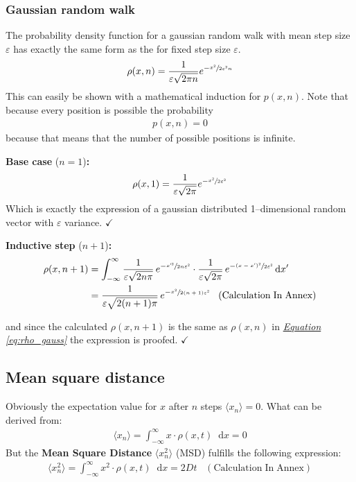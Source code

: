 \documentclass[a4paper, parskip=half]{scrartcl}
\newcommand{\effect}[1]{%
	\textbf{#1}%
}
\newcommand{\diff}{\mathop{}\!\mathrm{d}}
\newcommand{\myEqRef}[1]{\textit{\hyperref[eq:#1]{Equation \ref*{eq:#1}}}}
\newcommand{\myEqLabel}[1]{\label{eq:#1}}
\newcommand{\myEqAnnex}[1]{\;\;\;\mathrm{(Calculation\;In\;Annex)} \myEqLabel{#1}}
\begin{document}
\subsubsection{Gaussian random walk}
The probability density function for a gaussian random walk with mean step size $\varepsilon$ has exactly the same form as the for fixed step size $\varepsilon$.
\begin{align}
\rho(x,n) = \frac{1}{\varepsilon\sqrt{2\pi n}} e^{-\sfrac{x^2}{2\varepsilon^2 n}} \myEqLabel{rho_gauss}
\end{align}
This can easily be shown with a mathematical induction for $p(x,n)$. Note that because every position is possible the probability 
\begin{align}
p(x,n) = 0 
\end{align}
because that means that the number of possible positions is infinite.

\textbf{Base case} ($n = 1$)\textbf{:}
\begin{align}
\rho(x,1) = \frac{1}{\varepsilon\sqrt{2\pi}} e^{-\sfrac{x^2}{2\varepsilon^2}}
\end{align}
Which is exactly the expression of a gaussian distributed 1--dimensional random vector with $\varepsilon$ variance. $\checkmark$

\textbf{Inductive step} ($n + 1$)\textbf{:}
\begin{align}
\rho(x,n+1) &= \int_{-\infty}^\infty \frac{1}{\varepsilon\sqrt{2n\pi}}\, e^{-\sfrac{x'^2}{2n\varepsilon^2}} \cdot \frac{1}{\varepsilon\sqrt{2\pi}}\, e^{-\sfrac{(x - x')^2}{2\varepsilon^2}} \diff x'\\
&= \frac{1}{\varepsilon\sqrt{2(n+1)\pi}}\, e^{-\sfrac{x^2}{2(n+1)\varepsilon^2}} \myEqAnnex{gauss_random_walk}
\end{align}

and since the calculated $\rho(x,n+1)$ is the same as $\rho(x,n)$ in \myEqRef{rho_gauss} the expression is proofed. $\checkmark$
\subsection{Mean square distance}
Obviously the expectation value for $x$ after $n$ steps $\langle x_n\rangle = 0$. What can be derived from:
\begin{align}
\langle x_n\rangle = \int_{-\infty}^\infty x \cdot \rho(x,t)\diff x = 0
\end{align}
But the \effect{Mean Square Distance} $\langle x_n^2\rangle$ (MSD) fulfills the following expression:
\begin{align}
\langle x_n^2\rangle = \int_{-\infty}^\infty x^2 \cdot \rho(x,t)\diff x = 2 D t \myEqAnnex{MSD}
\end{align}
\end{document}
